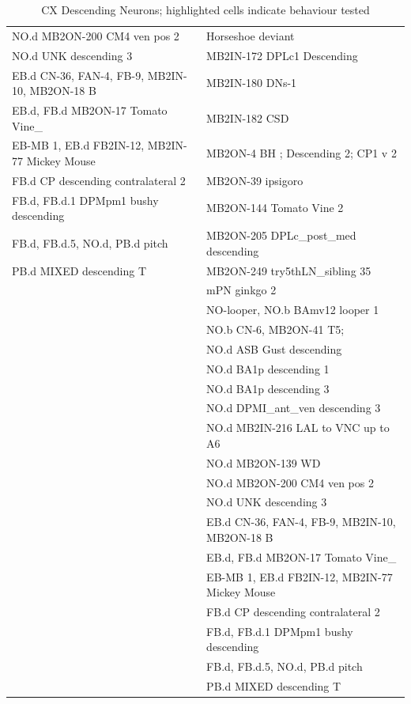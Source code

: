 \begin{table}[H]
{\begin{tabular}{p{}|p{}}
        NO.d MB2ON-200 CM4 ven pos 2 & Horseshoe deviant \\
        NO.d UNK descending 3 & \cellcolor{cxhl} MB2IN-172 DPLc1 Descending \\
        EB.d CN-36, FAN-4, FB-9, MB2IN-10, MB2ON-18 B & MB2IN-180 DNs-1 \\
        EB.d, FB.d MB2ON-17 Tomato Vine\_ & MB2IN-182 CSD \\
        EB-MB 1, EB.d FB2IN-12, MB2IN-77 Mickey Mouse & MB2ON-4 BH ; Descending 2; CP1 v 2 \\
        FB.d CP descending contralateral 2 & \cellcolor{cxhl} MB2ON-39 ipsigoro \\
        FB.d, FB.d.1 DPMpm1 bushy descending & MB2ON-144 Tomato Vine 2 \\
        FB.d, FB.d.5, NO.d, PB.d pitch & MB2ON-205 DPLc\_post\_med descending \\
        PB.d MIXED descending T & MB2ON-249 try5thLN\_sibling 35 \\
        & mPN ginkgo 2 \\
        & NO-looper, NO.b BAmv12 looper 1 \\
        & NO.b CN-6, MB2ON-41 T5; \\
        & NO.d ASB Gust descending \\
        & NO.d BA1p descending 1 \\
        & NO.d BA1p descending 3 \\
        & \cellcolor{cxhl} NO.d DPMI\_ant\_ven descending 3 \\
        & NO.d MB2IN-216 LAL to VNC up to A6 \\
        & NO.d MB2ON-139 WD \\
        & NO.d MB2ON-200 CM4 ven pos 2 \\
        & NO.d UNK descending 3 \\
        & EB.d CN-36, FAN-4, FB-9, MB2IN-10, MB2ON-18 B \\
        & EB.d, FB.d MB2ON-17 Tomato Vine\_ \\
        & EB-MB 1, EB.d FB2IN-12, MB2IN-77 Mickey Mouse \\
        & FB.d CP descending contralateral 2 \\
        & FB.d, FB.d.1 DPMpm1 bushy descending \\
        & FB.d, FB.d.5, NO.d, PB.d pitch \\
        & PB.d MIXED descending T \\
        \bottomrule
    \end{tabular}%
    }
    \caption[CX Descending Neurons]{CX Descending Neurons; highlighted cells indicate behaviour tested}
    \label{CXDescending}
\end{table}


